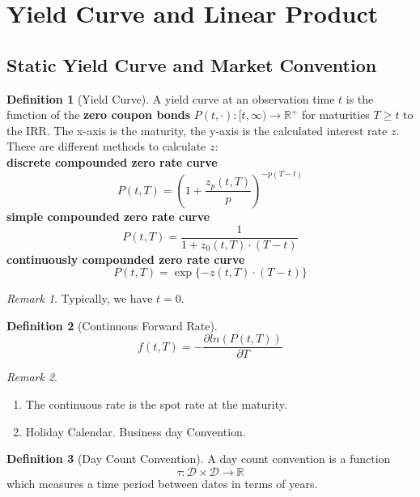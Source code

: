 \documentclass[a4paper,11pt]{book}
\theoremstyle{definition}
\newtheorem{definition}{Definition}[section]
\theoremstyle{remark}
\newtheorem*{remark}{Remark}
\begin{document}
\section{Yield Curve and Linear Product}
\subsection{Static Yield Curve and Market Convention}

\begin{definition}[Yield Curve]	
A yield curve at an observation time $t$ is the function of the \textbf{zero coupon bonds} $P(t, \cdot): [t, \infty) \rightarrow \mathbb{R}^+$ for maturities $T \geq t$ to the IRR. The x-axis is the maturity, the y-axis is the calculated interest rate $z$. There are different methods to calculate $z$:  \\
\textbf{discrete compounded zero rate curve}
\begin{equation*}
	P(t, T) = ( 1 + \frac{z_p(t, T)}{p})^{-p(T-t)}
\end{equation*}
\textbf{simple compounded zero rate curve}
\begin{equation*}
	P(t, T) = \frac{1}{1 + z_0(t, T)\cdot(T - t)}
\end{equation*}
\textbf{continuously compounded zero rate curve}
\begin{equation*}
	P(t, T) = \exp\{ - z(t, T) \cdot (T - t) \}
\end{equation*}
\end{definition}
\begin{remark}
Typically, we have $t = 0$. 	
\end{remark}


\begin{definition}[Continuous Forward Rate]
\begin{equation*}
	f(t, T) = -\frac{\partial ln(P(t, T))}{\partial T}
\end{equation*}
\end{definition}
\begin{remark}
\quad
\begin{enumerate}
	\item The continuous rate is the spot rate at the maturity. 
	\item Holiday Calendar. Business day Convention.
\end{enumerate}
\end{remark}

\begin{definition}[Day Count Convention]
A day count convention is a function 
\[
\tau : \mathcal{D} \times \mathcal{D} \to \mathbb{R}
\]
which measures a time period between dates in terms of years.
\end{definition}
\end{document}
